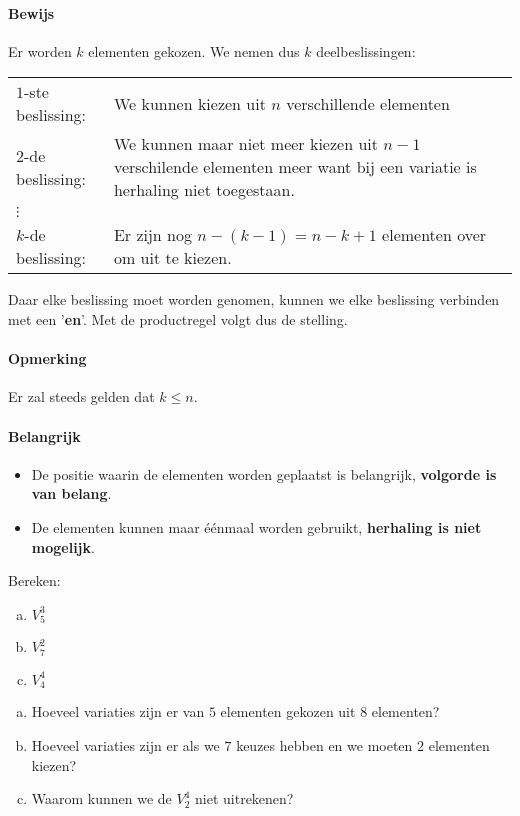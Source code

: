 \documentclass[12pt,a4paper,twoside]{article}
\begin{document}
\paragraph*{Bewijs}
Er worden $k$ elementen gekozen. We nemen dus $k$ deelbeslissingen:
\begin{center}
\begin{tabular}{lp{12cm}}
$1$-ste beslissing: & We kunnen kiezen uit $n$ verschillende elementen\\
$2$-de beslissing: & We kunnen maar niet meer kiezen uit $n-1$ verschilende elementen meer want bij een variatie is herhaling niet toegestaan.\\
$\vdots$ & \\
$k$-de beslissing: & Er zijn nog $n-(k-1)=n-k+1$ elementen over om uit te kiezen.
\end{tabular}
\end{center}
Daar elke beslissing moet worden genomen, kunnen we elke beslissing verbinden met een '{\bf en}'. Met de productregel volgt dus de stelling.


\paragraph*{Opmerking} Er zal steeds gelden dat $k\leq n$.

\paragraph*{Belangrijk}
\begin{itemize}
  \item De positie waarin de elementen worden geplaatst is belangrijk, {\bf volgorde is van belang}.
  \item De elementen kunnen maar éénmaal worden gebruikt, {\bf herhaling is niet mogelijk}.
\end{itemize}

\begin{oefening}
Bereken:
\begin{multicols}{3}
\begin{enumerate}[(a)]
  \item $V^3_5$
  \item $V^2_7$
  \item $V^4_4$
\end{enumerate}
\end{multicols}
\end{oefening}

\begin{oefening}
\begin{enumerate}[(a)]
  \item Hoeveel variaties zijn er van $5$ elementen gekozen uit $8$ elementen?
  \item Hoeveel variaties zijn er als we $7$ keuzes hebben en we moeten $2$ elementen kiezen?
  \item Waarom kunnen we de $V^4_2$ niet uitrekenen?
  \end{enumerate}
\end{oefening}
\end{document}
